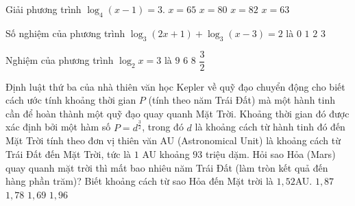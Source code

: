 \begin{ex}%
	Giải  phương trình $\log_{4}(x-1)=3$.
	\choice 
		{\True $x=65$} 
		{$x=80$} 
		{$x=82$} 
		{$x=63$} 
\end{ex}

\begin{ex}%
	Số  nghiệm của phương trình ${{\log}_3}\left(2x+1\right)+{{\log}_3}\left(x-3\right)=2$ là
	\choice 
		{$0$} 
		 {\True $1$}
		 {$2$}
		 {$3$}
\end{ex}

\begin{ex}%
	Nghiệm của phương  trình $\log _{2}x=3$ là
	 \choice
		{$9$} 
		 {$6$}
		 {\True $8$}
		{$\dfrac{3}{2}$} 
\end{ex}

\begin{ex}%
	Định luật thứ ba của nhà thiên văn  học Kepler về quỹ đạo chuyển động cho biết cách ước tính khoảng thời gian $P$ (tính theo năm Trái Đất) mà một hành tinh cần để hoàn thành một quỹ đạo quay quanh Mặt Trời.
	Khoảng thời gian đó được xác định bởi một hàm số $P=d^{\tfrac{3}{2}}$, trong đó $d$ là khoảng cách từ hành tinh đó đến Mặt Trời tính theo đơn vị thiên văn AU (Astronomical Unit) là khoảng cách từ Trái Đất đến Mặt Trời, tức là $1$ AU khoảng $93$ triệu dặm. Hỏi sao Hỏa (Mars) quay quanh mặt trời thì mất bao nhiêu năm Trái Đất (làm tròn kết quả đến hàng phần trăm)? Biết khoảng cách từ  sao Hỏa đến Mặt trời là $1{,}52$AU.
	\choice 
		 {$1{,}87$}
		 {$1{,}78$}
		 {$1{,}69$}
		 {$1{,}96$}
\end{ex}


